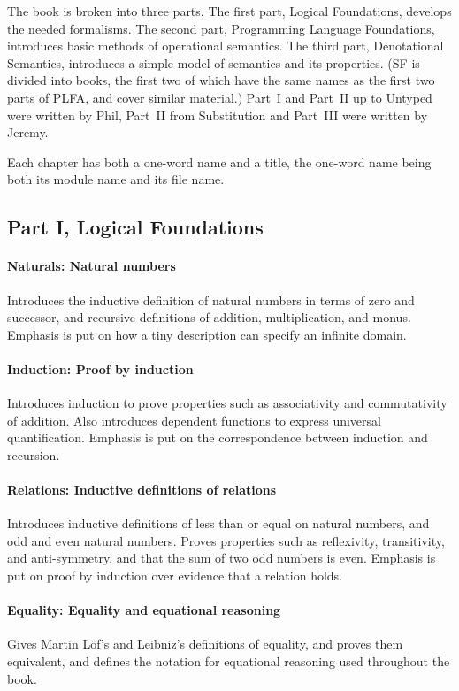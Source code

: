 \documentclass[preprint,authoryear]{elsarticle}
\begin{document}
The book is broken into three parts. The first part, Logical Foundations,
develops the needed formalisms.  The second part, Programming Language
Foundations, introduces basic methods of operational semantics.
The third part, Denotational Semantics, introduces a simple
model of semantics and its properties.
(SF is divided into books, the first two of which have the same names
as the first two parts of PLFA, and cover similar material.)
Part~I and Part~II up to Untyped were written by Phil,
Part~II from Substitution and Part~III were written by Jeremy.

Each chapter has both a one-word name and a title, the one-word name
being both its module name and its file name.

\subsection*{Part I, Logical Foundations}

\paragraph{Naturals: Natural numbers}
Introduces the inductive definition of natural numbers in terms of
zero and successor, and recursive definitions of addition,
multiplication, and monus. Emphasis is put on how a tiny description
can specify an infinite domain.

\paragraph{Induction: Proof by induction}
Introduces induction to prove properties
such as associativity and commutativity of addition.
Also introduces dependent functions to express universal quantification.
Emphasis is put on the correspondence between induction and recursion.

\paragraph{Relations: Inductive definitions of relations}
Introduces inductive definitions of less than or equal on natural numbers,
and odd and even natural numbers.
Proves properties such as reflexivity, transitivity, and
anti-symmetry, and that the sum of two odd numbers is even.
Emphasis is put on proof by induction over evidence that a relation holds.

\paragraph{Equality: Equality and equational reasoning}
Gives Martin L\"of's and Leibniz's definitions of equality, and proves
them equivalent, and defines the notation for equational reasoning used
throughout the book.
\end{document}
